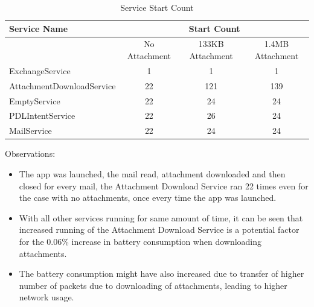 \begin{table}[!h]
\centering
\caption{Service Start Count}
\label{my-label}
\begin{tabular}{|l|c|c|c|}
\hline
Service Name              & \multicolumn{3}{c|}{Start Count}                    \\ \hline
                          & No Attachment & 133KB Attachment & 1.4MB Attachment \\ \hline
ExchangeService           & 1             & 1                & 1                \\ \hline
AttachmentDownloadService & 22             & 121               & 139              \\ \hline
EmptyService              & 22             & 24                & 24                \\ \hline
PDLIntentService          & 22             & 26                & 24                \\ \hline
MailService               & 22             & 24                & 24                \\ \hline
\end{tabular}
\end{table}
\pagebreak
Observations: 
\begin{itemize}
	\item The app was launched, the mail read, attachment downloaded and then closed for every mail, the Attachment Download Service ran 22 times even for the case with no attachments, once every time the app was launched. 
	\item With all other services running for same amount of time, it can be seen that increased running of the Attachment Download Service is a potential factor for the 0.06\% increase in battery consumption when downloading attachments. 
	\item The battery consumption might have also increased due to transfer of higher number of packets due to downloading of attachments, leading to higher network usage.
\end{itemize}

